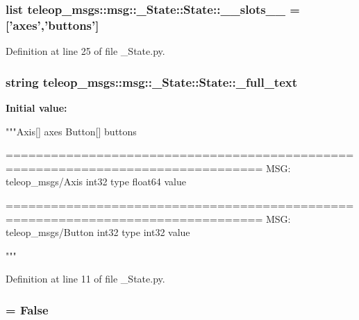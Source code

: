 \subsubsection[{\_\-\_\-slots\_\-\_\-}]{\setlength{\rightskip}{0pt plus 5cm}list {\bf teleop\_\-msgs::msg::\_\-State::State::\_\-\_\-slots\_\-\_\-} = ['{\bf axes}','{\bf buttons}']\hspace{0.3cm}{\ttfamily  [static, private]}}\label{classteleop__msgs_1_1msg_1_1__State_1_1State_aa5b7b7d733410c58b0ce0ea5d8493425}


Definition at line 25 of file \_\-State.py.

\subsubsection[{\_\-full\_\-text}]{\setlength{\rightskip}{0pt plus 5cm}string {\bf teleop\_\-msgs::msg::\_\-State::State::\_\-full\_\-text}\hspace{0.3cm}{\ttfamily  [static, private]}}\label{classteleop__msgs_1_1msg_1_1__State_1_1State_a89aab9e6542fd67c0444ef72df5dfae4}
{\bfseries Initial value:}
\begin{DoxyCode}
"""Axis[] axes
Button[] buttons

================================================================================
MSG: teleop_msgs/Axis
int32 type
float64 value

================================================================================
MSG: teleop_msgs/Button
int32 type
int32 value

"""
\end{DoxyCode}


Definition at line 11 of file \_\-State.py.

\subsubsection[{\_\-has\_\-header}]{ = False\hspace{0.3cm}{\ttfamily  [static, private]}}\label{classteleop__msgs_1_1msg_1_1__State_1_1State_aac8350f4474e88d98fe62f5e92a43e25}


